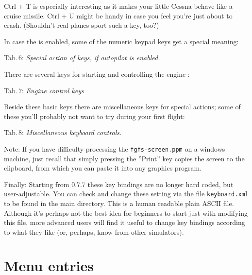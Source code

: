 \noindent Ctrl + T is especially interesting as it makes your little Cessna behave
like a cruise missile. Ctrl + U might be handy in case you feel you're just about to
crash. (Shouldn't real planes sport such a key, too?)

In case the  is enabled, some of the numeric keypad keys get a special
meaning:

\noindent
 Tab.\,6: \textit{Special action of keys, if autopilot is enabled.}
\medskip

\centerline{}
\medskip

There are several keys for starting and controlling the engine :

\noindent
 Tab.\,7: \textit{Engine control keys}
\medskip

\centerline{}
\medskip

Beside these basic keys there are miscellaneous keys for special actions; some of these you'll probably not want to try during your first flight:
\vfill
\eject

\noindent Tab.\,8: \textit{Miscellaneous keyboard controls.}
\medskip

\centerline{}
\medskip

\noindent
 Note: If you have difficulty processing the  \texttt{fgfs-screen.ppm}
on a windows machine, just recall that simply pressing the ''Print'' key copies the
screen to the clipboard, from which you can paste it into any graphics program.

Finally: Starting from \FlightGear{} 0.7.7  these key bindings are no longer hard coded, but user-adjustable. You can check and change these setting via the file \texttt{keyboard.xml} to
be found in the main \FlightGear{} directory. This is a human readable plain ASCII file.
Although it's perhaps not the best idea for beginners to start just with modifying this
file, more advanced users will find it useful to change key bindings according to what
they like (or, perhaps, know from other simulators).

\section{Menu entries}

